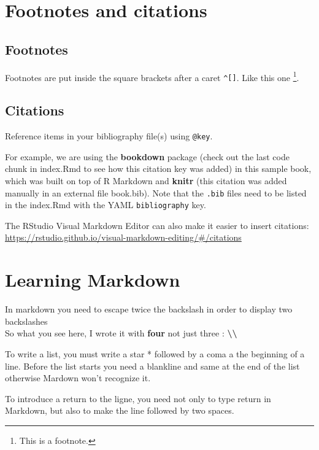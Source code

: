 \documentclass[
]{book}
\begin{document}
\hypertarget{footnotes-and-citations}{%
\chapter{Footnotes and citations}\label{footnotes-and-citations}}

\hypertarget{footnotes}{%
\section{Footnotes}\label{footnotes}}

Footnotes are put inside the square brackets after a caret \texttt{\^{}{[}{]}}. Like this one \footnote{This is a footnote.}.

\hypertarget{citations}{%
\section{Citations}\label{citations}}

Reference items in your bibliography file(s) using \texttt{@key}.

For example, we are using the \textbf{bookdown} package \citep{R-bookdown} (check out the last code chunk in index.Rmd to see how this citation key was added) in this sample book, which was built on top of R Markdown and \textbf{knitr} \citep{xie2015} (this citation was added manually in an external file book.bib).
Note that the \texttt{.bib} files need to be listed in the index.Rmd with the YAML \texttt{bibliography} key.

The RStudio Visual Markdown Editor can also make it easier to insert citations: \url{https://rstudio.github.io/visual-markdown-editing/\#/citations}

\hypertarget{learning-markdown}{%
\chapter{Learning Markdown}\label{learning-markdown}}

In markdown you need to escape twice the backslash in order to display two backslashes\\
So what you see here, I wrote it with \textbf{four} not just three : \textbf{\textbackslash\textbackslash{}}

To write a list, you must write a star * followed by a coma a the beginning of a line.
Before the list starts you need a blankline and same at the end of the list otherwise Mardown won't recognize it.

To introduce a return to the ligne, you need not only to type return in Markdown, but also to make the line followed by two spaces.
\end{document}
